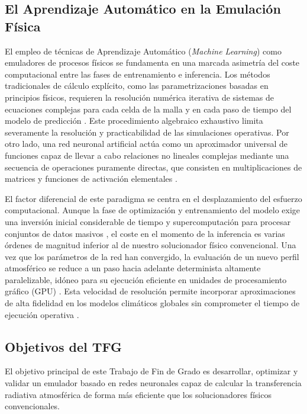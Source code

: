 \documentclass[11pt,a4paper,twoside,pdf]{article}
\numberwithin{equation}{section}
\begin{document}
\subsection{El Aprendizaje Automático en la Emulación Física}

El empleo de técnicas de Aprendizaje Automático (\textit{Machine Learning}) como emuladores de procesos físicos se fundamenta en una marcada asimetría del coste computacional entre las fases de entrenamiento e inferencia. Los métodos tradicionales de cálculo explícito, como las parametrizaciones basadas en principios físicos, requieren la resolución numérica iterativa de sistemas de ecuaciones complejas para cada celda de la malla y en cada paso de tiempo del modelo de predicción \cite{Ukkonen2022}. Este procedimiento algebraico exhaustivo limita severamente la resolución y practicabilidad de las simulaciones operativas. Por otro lado, una red neuronal artificial actúa como un aproximador universal de funciones capaz de llevar a cabo relaciones no lineales complejas mediante una secuencia de operaciones puramente directas, que consisten en multiplicaciones de matrices y funciones de activación elementales \cite{Aryandoust2023}.

El factor diferencial de este paradigma se centra en el desplazamiento del esfuerzo computacional. Aunque la fase de optimización y entrenamiento del modelo exige una inversión inicial considerable de tiempo y supercomputación para procesar conjuntos de datos masivos \cite{ClimSim2023}, el coste en el momento de la inferencia es varias órdenes de magnitud inferior al de nuestro solucionador físico convencional. Una vez que los parámetros de la red han convergido, la evaluación de un nuevo perfil atmosférico se reduce a un paso hacia adelante determinista altamente paralelizable, idóneo para su ejecución eficiente en unidades de procesamiento gráfico (GPU) \cite{Zhong2023}. Esta velocidad de resolución permite incorporar aproximaciones de alta fidelidad en los modelos climáticos globales sin comprometer el tiempo de ejecución operativa \cite{ClimART2021}.

\subsection{Objetivos del TFG}


El objetivo principal de este Trabajo de Fin de Grado es desarrollar, optimizar y validar un emulador basado en redes neuronales capaz de calcular la transferencia radiativa atmosférica de forma más eficiente que los solucionadores físicos convencionales. 
\end{document}
